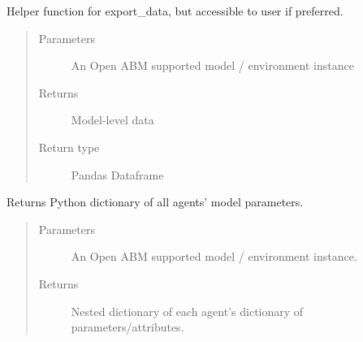 \documentclass[letterpaper,10pt,english]{sphinxmanual}
\begin{document}
\begin{fulllineitems}
\label{\detokenize{index:oabm_tools.export_model_data}}
Helper function for export\_data, but accessible to user if preferred.
\begin{quote}\begin{description}
\item[{Parameters}] \leavevmode
{} \textendash{} An Open ABM supported model / environment instance

\item[{Returns}] \leavevmode
Model-level data

\item[{Return type}] \leavevmode
Pandas Dataframe

\end{description}\end{quote}

\end{fulllineitems}


\begin{fulllineitems}
\label{\detokenize{index:oabm_tools.get_agent_parameters}}
Returns Python dictionary of all agents’ model parameters.
\begin{quote}\begin{description}
\item[{Parameters}] \leavevmode
{} \textendash{} An Open ABM supported model / environment instance.

\item[{Returns}] \leavevmode
Nested dictionary of each agent’s dictionary of parameters/attributes.

\end{description}\end{quote}

\end{fulllineitems}

\end{document}
